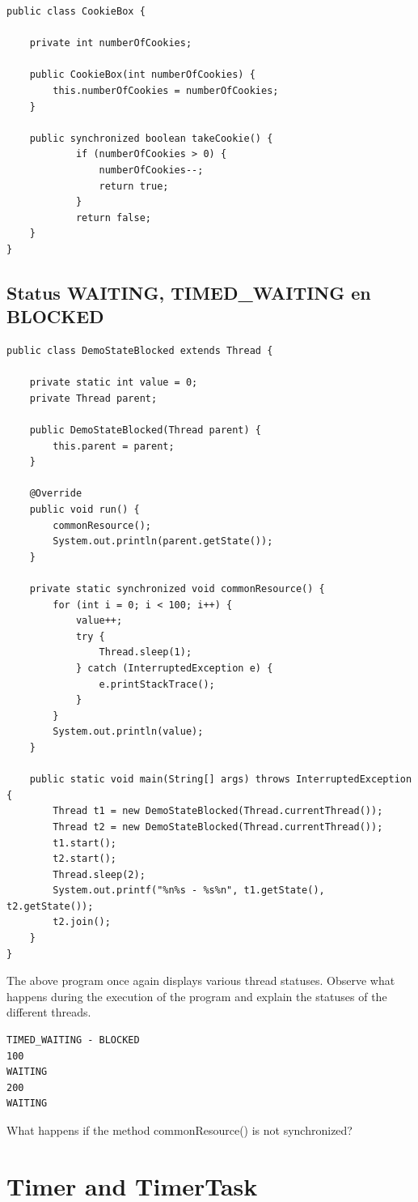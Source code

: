 \begin{lstlisting}
public class CookieBox {

	private int numberOfCookies;

	public CookieBox(int numberOfCookies) {
		this.numberOfCookies = numberOfCookies;
	}

	public synchronized boolean takeCookie() {
			if (numberOfCookies > 0) {
				numberOfCookies--;
				return true;
			}
			return false;
	}
}
\end{lstlisting}

\subsection{Status WAITING, TIMED\_WAITING en BLOCKED}

\begin{lstlisting}
public class DemoStateBlocked extends Thread {

	private static int value = 0;
	private Thread parent;

	public DemoStateBlocked(Thread parent) {
		this.parent = parent;
	}

	@Override
	public void run() {
		commonResource();
		System.out.println(parent.getState());
	}

	private static synchronized void commonResource() {
		for (int i = 0; i < 100; i++) {
			value++;
			try {
				Thread.sleep(1);
			} catch (InterruptedException e) {
				e.printStackTrace();
			}
		}
		System.out.println(value);
	}

	public static void main(String[] args) throws InterruptedException {
		Thread t1 = new DemoStateBlocked(Thread.currentThread());
		Thread t2 = new DemoStateBlocked(Thread.currentThread());
		t1.start();
		t2.start();
		Thread.sleep(2);
		System.out.printf("%n%s - %s%n", t1.getState(), t2.getState());
		t2.join();
	}
}
\end{lstlisting}

The above program once again displays various thread statuses.
Observe what happens during the execution of the program and explain the statuses of the different threads.

\begin{verbatim}
TIMED_WAITING - BLOCKED
100
WAITING
200
WAITING
\end{verbatim}

What happens if the method commonResource() is not synchronized?

\section{Timer and TimerTask}

